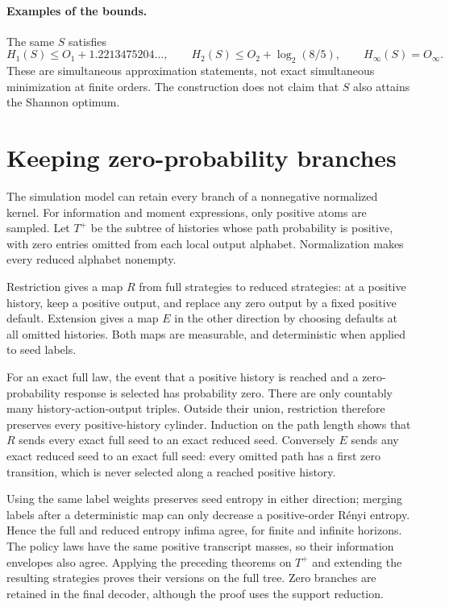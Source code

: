 \documentclass[11pt,a4paper]{article}
\theoremstyle{definition}\newtheorem{definition}[theorem]{Definition}
\theoremstyle{remark}\newtheorem{remark}[theorem]{Remark}
\numberwithin{equation}{section}
\begin{document}
\paragraph{Examples of the bounds.}
The same $S$ satisfies
\[
 H_1(S)\le O_1+1.2213475204\ldots,\qquad
 H_2(S)\le O_2+\log_2(8/5),\qquad H_\infty(S)=O_\infty.
\]
These are simultaneous approximation statements, not exact simultaneous
minimization at finite orders. The construction does not claim that $S$
also attains the Shannon optimum.



\section{Keeping zero-probability branches}\label{sec:zero}
The simulation model can retain every branch of a nonnegative normalized
kernel. For information and moment expressions, only positive atoms are
sampled. Let $T^+$ be the subtree of histories whose path probability is
positive, with zero entries omitted from each local output alphabet.
Normalization makes every reduced alphabet nonempty.

Restriction gives a map $R$ from full strategies to reduced strategies:
at a positive history, keep a positive output, and replace any zero output
by a fixed positive default. Extension gives a map $E$ in the other
direction by choosing defaults at all omitted histories. Both maps are
measurable, and deterministic when applied to seed labels.

For an exact full law, the event that a positive history is reached and
a zero-probability response is selected has probability zero. There are
only countably many history-action-output triples. Outside their union,
restriction therefore preserves every positive-history cylinder.
Induction on the path length shows that $R$ sends every exact full seed
to an exact reduced seed. Conversely $E$ sends any exact reduced seed
to an exact full seed: every omitted path has a first zero transition,
which is never selected along a reached positive history.

Using the same label weights preserves seed entropy in either direction;
merging labels after a deterministic map can only decrease a positive-order
R\'enyi entropy. Hence the full and reduced entropy infima agree, for
finite and infinite horizons. The policy laws have the same positive
transcript masses, so their information envelopes also agree. Applying
the preceding theorems on $T^+$ and extending the resulting strategies
proves their versions on the full tree. Zero branches are retained in the
final decoder, although the proof uses the support reduction.
\end{document}
